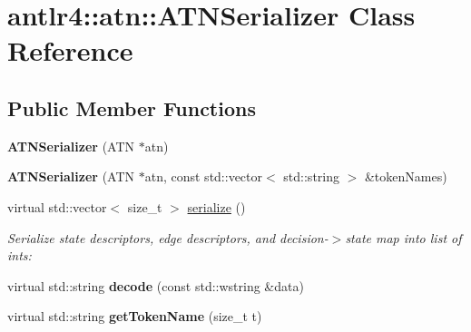 \hypertarget{classantlr4_1_1atn_1_1ATNSerializer}{}\section{antlr4\+:\+:atn\+:\+:A\+T\+N\+Serializer Class Reference}
\label{classantlr4_1_1atn_1_1ATNSerializer}
\subsection*{Public Member Functions}
\begin{DoxyCompactItemize}
\item 
\mbox{\label{classantlr4_1_1atn_1_1ATNSerializer_a75bff3cf4e62ff43bfdedd1795f9fad8}} 
{\bfseries A\+T\+N\+Serializer} (A\+TN $\ast$atn)
\item 
\mbox{\label{classantlr4_1_1atn_1_1ATNSerializer_a17b466a6c4cf5e9e44224b8a245f7231}} 
{\bfseries A\+T\+N\+Serializer} (A\+TN $\ast$atn, const std\+::vector$<$ std\+::string $>$ \&token\+Names)
\item 
virtual std\+::vector$<$ size\+\_\+t $>$ \hyperlink{classantlr4_1_1atn_1_1ATNSerializer_ae4d16b888446eddfd0faaf5356d6d884}{serialize} ()
\begin{DoxyCompactList}\small\item\em Serialize state descriptors, edge descriptors, and decision-\/$>$state map into list of ints\+: \end{DoxyCompactList}\item 
\mbox{\label{classantlr4_1_1atn_1_1ATNSerializer_a938398654ea3ca5d26699dce55785600}} 
virtual std\+::string {\bfseries decode} (const std\+::wstring \&data)
\item 
\mbox{\label{classantlr4_1_1atn_1_1ATNSerializer_a90abb185836850e7d17be3e94109b45b}} 
virtual std\+::string {\bfseries get\+Token\+Name} (size\+\_\+t t)
\end{DoxyCompactItemize}

